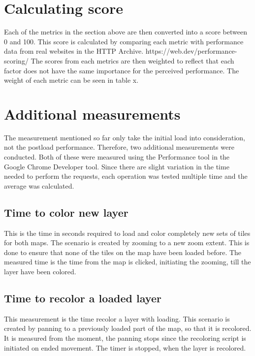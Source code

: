 \section{Calculating score}

Each of the metrics in the section above are then converted into a score between 0 and 100. This score is calculated by comparing each metric with performance data from real websites in the HTTP Archive.
https://web.dev/performance-scoring/
The scores from each metrics are then weighted to reflect that each factor does not have the same importance for the perceived performance. The weight of each metric can be seen in table x.


\section{Additional measurements}

The measurement mentioned so far only take the initial load into consideration, not the postload performance. 
Therefore, two additional measurements were conducted. Both of these were measured using the Performance tool in the Google Chrome Developer tool. Since there are slight variation in the time needed to perform the requests, each operation was tested multiple time and the average was calculated.
\subsection{Time to color new layer}
This is the time in seconds required to load and color completely new sets of tiles for both maps. The scenario is created by zooming to a new zoom extent. This is done to ensure that none of the tiles on the map have been loaded before. The measured time is the time from the map is clicked, initiating the zooming, till the layer have been colored.

\subsection{Time to recolor a loaded layer}
This measurement is the time recolor a layer with loading. This scenario is created by panning to a previously loaded part of the map, so that it is recolored.
It is measured from the moment, the panning stops since the recoloring script is initiated on ended movement. The timer is stopped, when the layer is recolored.

